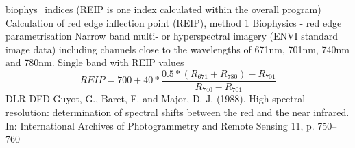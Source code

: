 %
{ %
biophys\_indices (REIP is one index calculated within the overall program)
}
%
{ %
Calculation of red edge inflection point (REIP), method 1
}
%
{ %
Biophysics - red edge parametrisation
}
%
{ %
Narrow band multi- or hyperspectral imagery (ENVI standard image data) including channels close to the wavelengths of 671nm, 701nm, 740nm and 780nm.\bigskip
}
%
{ %
Single band with REIP values
}
%
{ %
\begin{displaymath}
REIP =  700+40*\frac{0.5*(R_{671}+R_{780})-R_{701}}{R_{740}-R_{701}}
\end{displaymath}
}
%
{ %
DLR-DFD
}
%
{ %
Guyot, G., Baret, F. and Major, D. J. (1988). High spectral resolution: determination of spectral shifts between the red and the near infrared. In: International Archives of Photogrammetry and Remote Sensing 11, p. 750–760
}
